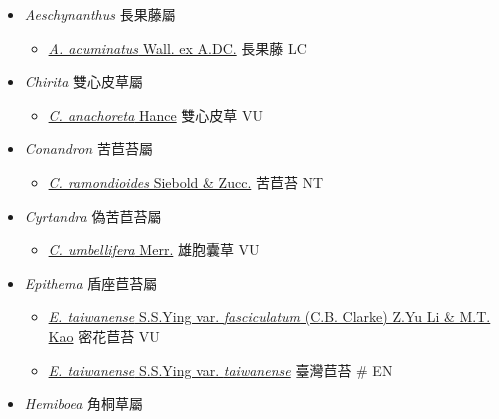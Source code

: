
  \begin{itemize}
 \item[] \textit{Aeschynanthus} 長果藤屬
                                
  \begin{itemize}
        \item[] \href{http://www.theplantlist.org/tpl1.1/search?q=Aeschynanthus+acuminatus}{\textit{A. acuminatus} Wall. ex A.DC.}   長果藤   LC
  \end{itemize}
 \item[] \textit{Chirita} 雙心皮草屬
                                
  \begin{itemize}
        \item[] \href{http://www.theplantlist.org/tpl1.1/search?q=Chirita+anachoreta}{\textit{C. anachoreta} Hance}   雙心皮草   VU
  \end{itemize}
 \item[] \textit{Conandron} 苦苣苔屬
                                
  \begin{itemize}
        \item[] \href{http://www.theplantlist.org/tpl1.1/search?q=Conandron+ramondioides}{\textit{C. ramondioides} Siebold \& Zucc.}   苦苣苔   NT
  \end{itemize}
 \item[] \textit{Cyrtandra} 偽苦苣苔屬
                                
  \begin{itemize}
        \item[] \href{http://www.theplantlist.org/tpl1.1/search?q=Cyrtandra+umbellifera}{\textit{C. umbellifera} Merr.}   雄胞囊草   VU
  \end{itemize}
 \item[] \textit{Epithema} 盾座苣苔屬
                                
  \begin{itemize}
        \item[] \href{http://www.theplantlist.org/tpl1.1/search?q=Epithema+taiwanense+var.+fasciculatum}{\textit{E. taiwanense} S.S.Ying var. \textit{fasciculatum} (C.B. Clarke) Z.Yu Li \& M.T. Kao}   密花苣苔   VU
        \item[] \href{http://www.theplantlist.org/tpl1.1/search?q=Epithema+taiwanense+var.+taiwanense}{\textit{E. taiwanense} S.S.Ying var. \textit{taiwanense}}   臺灣苣苔  \# EN
  \end{itemize}
 \item[] \textit{Hemiboea} 角桐草屬
                                

\end{itemize}
